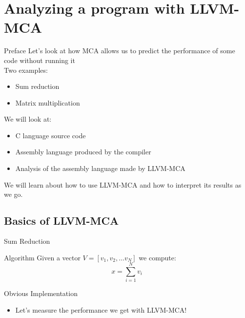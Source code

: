 
\section{Analyzing a program with LLVM-MCA}


\begin{frame}{Preface}
Let's look at how MCA allows us to predict the performance of some code \alert{without running it}\\
\medskip
Two examples:
\begin{itemize}
\item Sum reduction
\item Matrix multiplication
\end{itemize}
\medskip
We will look at:
\begin{itemize}
\item C language source code
\item Assembly language produced by the compiler
\item Analysis of the assembly language made by LLVM-MCA
\end{itemize}
We will learn about how to use LLVM-MCA and how to interpret its results as we go.
\end{frame}


\subsection{Basics of LLVM-MCA}


\begin{frame}{Sum Reduction}
\begin{block}{Algorithm}
Given a vector $V = [v_1, v_2, \ldots v_N]$ we compute:\\
\[
x = \sum_{i=1}^{N}{v_i}
\]
\end{block}
\begin{block}{Obvious Implementation}
\end{block}
\begin{itemize}
\item Let's measure the performance we get with LLVM-MCA!
\end{itemize}
\end{frame}


